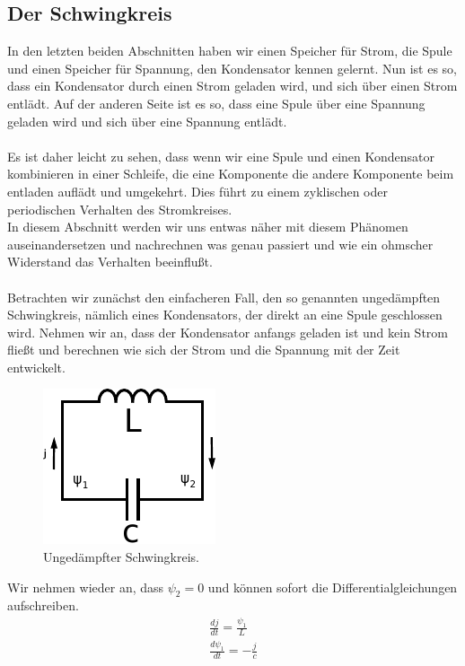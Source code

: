\documentclass[11pt,a4paper,leqno]{report}
\numberwithin{equation}{chapter}
\begin{document}
\subsection{Der Schwingkreis}
In den letzten beiden Abschnitten haben wir einen Speicher f\"ur Strom, die Spule und einen Speicher f\"ur Spannung, den Kondensator kennen gelernt. Nun ist es so, dass ein Kondensator durch einen Strom geladen wird, und sich \"uber einen Strom entl\"adt. Auf der anderen Seite ist es so, dass eine Spule \"uber eine Spannung geladen wird und sich \"uber eine Spannung entl\"adt.\\
\\
Es ist daher leicht zu sehen, dass wenn wir eine Spule und einen Kondensator kombinieren in einer Schleife, die eine Komponente die andere Komponente beim entladen aufl\"adt und umgekehrt. Dies f\"uhrt zu einem zyklischen oder periodischen Verhalten des Stromkreises. \\
In diesem Abschnitt werden wir uns entwas n\"aher mit diesem Ph\"anomen auseinandersetzen und nachrechnen was genau passiert und wie ein ohmscher Widerstand das Verhalten beeinflu\ss{}t.\\
\\
Betrachten wir zun\"achst den einfacheren Fall, den so genannten unged\"ampften Schwingkreis, n\"amlich eines Kondensators, der direkt an eine Spule geschlossen wird. Nehmen wir an, dass der Kondensator anfangs geladen ist und kein Strom flie\ss{}t und berechnen wie sich der Strom und die Spannung mit der Zeit entwickelt.
\begin{figure}[H]
	\begin{center}
		\includegraphics[scale=1]{schnwingkreis_ungedampft.pdf}
		\caption{Unged\"ampfter Schwingkreis.}
	\end{center}
\end{figure}
\noindent
Wir nehmen wieder an, dass $\psi_2=0$ und k\"onnen sofort die Differentialgleichungen aufschreiben.
 \begin{align} 
\frac{dj}{dt} = \frac{\psi_1}{L}\\
\frac{d\psi_1}{dt} = -\frac{j}{c}
\end{align}
\end{document}
